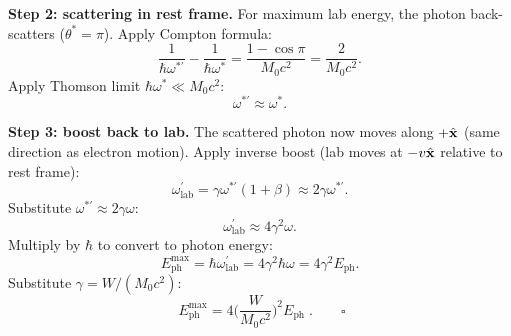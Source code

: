 \documentclass[11pt]{article}
\begin{document}
\textbf{Step 2: scattering in rest frame.} For maximum lab energy, the photon back-scatters ($\theta^*=\pi$). Apply Compton formula:
\[
\frac{1}{\hbar\omega^{*\prime}} - \frac{1}{\hbar\omega^*} = \frac{1-\cos\pi}{M_0 c^2} = \frac{2}{M_0 c^2}.
\]
Apply Thomson limit $\hbar\omega^*\ll M_0 c^2$:
\[
\omega^{*\prime}\approx \omega^*.
\]

\textbf{Step 3: boost back to lab.} The scattered photon now moves along $+\hat{\vb x}$ (same direction as electron motion). Apply inverse boost (lab moves at $-v\hat{\vb x}$ relative to rest frame):
\[
\omega^\prime_\text{lab} = \gamma\omega^{*\prime}(1+\beta) \approx 2\gamma\omega^{*\prime}.
\]
Substitute $\omega^{*\prime}\approx 2\gamma\omega$:
\[
\omega^\prime_\text{lab} \approx 4\gamma^2\omega.
\]
Multiply by $\hbar$ to convert to photon energy:
\[
E_\text{ph}^\text{max} = \hbar\omega^\prime_\text{lab} = 4\gamma^2\hbar\omega = 4\gamma^2 E_\text{ph}.
\]
Substitute $\gamma=W/(M_0 c^2)$:
\[
\boxed{\;E_\text{ph}^\text{max} = 4\biggl(\frac{W}{M_0 c^2}\biggr)^2 E_\text{ph}\;}.\qquad\square
\]
\end{document}

